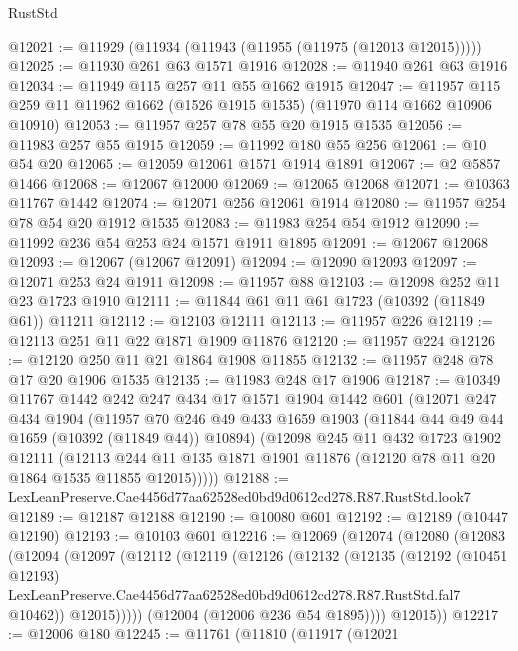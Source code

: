 \begin{lexlean}{RustStd}
\begin{coremodule}
{{@12021 := @11929 (@11934 (@11943 (@11955 (@11975 (@12013 @12015)))))
@12025 := @11930 @261 @63 @1571 @1916
@12028 := @11940 @261 @63 @1916
@12034 := @11949 @115 @257 @11 @55 @1662 @1915
@12047 := @11957 @115 @259 @11 @11962 @1662 (@1526 @1915 @1535) (@11970 @114 @1662 @10906 @10910)
@12053 := @11957 @257 @78 @55 @20 @1915 @1535
@12056 := @11983 @257 @55 @1915
@12059 := @11992 @180 @55 @256
@12061 := @10 @54 @20
@12065 := @12059 @12061 @1571 @1914 @1891
@12067 := @2 @5857 @1466
@12068 := @12067 @12000
@12069 := @12065 @12068
@12071 := @10363 @11767 @1442
@12074 := @12071 @256 @12061 @1914
@12080 := @11957 @254 @78 @54 @20 @1912 @1535
@12083 := @11983 @254 @54 @1912
@12090 := @11992 @236 @54 @253 @24 @1571 @1911 @1895
@12091 := @12067 @12068
@12093 := @12067 (@12067 @12091)
@12094 := @12090 @12093
@12097 := @12071 @253 @24 @1911
@12098 := @11957 @88
@12103 := @12098 @252 @11 @23 @1723 @1910
@12111 := @11844 @61 @11 @61 @1723 (@10392 (@11849 @61)) @11211
@12112 := @12103 @12111
@12113 := @11957 @226
@12119 := @12113 @251 @11 @22 @1871 @1909 @11876
@12120 := @11957 @224
@12126 := @12120 @250 @11 @21 @1864 @1908 @11855
@12132 := @11957 @248 @78 @17 @20 @1906 @1535
@12135 := @11983 @248 @17 @1906
@12187 := @10349
    @11767
    @1442
    @242
    @247
    @434
    @17
    @1571
    @1904
    @1442
    @601
    (@12071
      @247
      @434
      @1904
      (@11957
        @70
        @246
        @49
        @433
        @1659
        @1903
        (@11844 @44 @49 @44 @1659 (@10392 (@11849 @44)) @10894)
        (@12098
          @245
          @11
          @432
          @1723
          @1902
          @12111
          (@12113
            @244
            @11
            @135
            @1871
            @1901
            @11876
            (@12120 @78 @11 @20 @1864 @1535 @11855 @12015)))))
@12188 := LexLeanPreserve.Cae4456d77aa62528ed0bd9d0612cd278.R87.RustStd.look7
@12189 := @12187 @12188
@12190 := @10080 @601
@12192 := @12189 (@10447 @12190)
@12193 := @10103 @601
@12216 := @12069
    (@12074
      (@12080
        (@12083
          (@12094
            (@12097
              (@12112
                (@12119
                  (@12126
                    (@12132
                      (@12135
                        (@12192
                          (@10451 @12193)
                          LexLeanPreserve.Cae4456d77aa62528ed0bd9d0612cd278.R87.RustStd.fal7
                          @10462))
                      @12015)))))
            (@12004 (@12006 @236 @54 @1895))))
        @12015))
@12217 := @12006 @180
@12245 := @11761
    (@11810
      (@11917
        (@12021
}}
\end{coremodule}
\end{lexlean}
